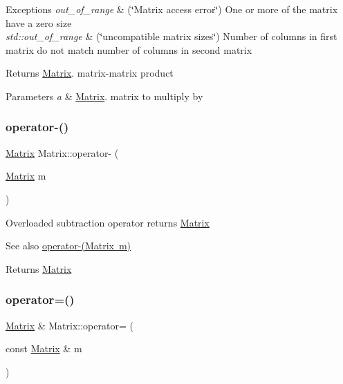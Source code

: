 \begin{DoxyExceptions}{Exceptions}
{\em out\+\_\+of\+\_\+range} & (\char`\"{}\+Matrix access error\char`\"{}) One or more of the matrix have a zero size \\
\hline
{\em std\+::out\+\_\+of\+\_\+range} & (\char`\"{}uncompatible matrix sizes\char`\"{}) Number of columns in first matrix do not match number of columns in second matrix \\
\hline
\end{DoxyExceptions}
\begin{DoxyReturn}{Returns}
\mbox{\hyperlink{class_matrix}{Matrix}}. matrix-\/matrix product 
\end{DoxyReturn}

\begin{DoxyParams}{Parameters}
{\em a} & \mbox{\hyperlink{class_matrix}{Matrix}}. matrix to multiply by \\
\hline
\end{DoxyParams}
\mbox{\label{class_matrix_a2aabf841a4302d528f8b102c0800a263}} 
\subsubsection{\texorpdfstring{operator-\/()}{operator-()}}
{\footnotesize\ttfamily \mbox{\hyperlink{class_matrix}{Matrix}} Matrix\+::operator-\/ (\begin{DoxyParamCaption}\item[{\mbox{\hyperlink{class_matrix}{Matrix}}}]{m }\end{DoxyParamCaption})}

Overloaded subtraction operator returns \mbox{\hyperlink{class_matrix}{Matrix}} \begin{DoxySeeAlso}{See also}
\mbox{\hyperlink{class_matrix_a2aabf841a4302d528f8b102c0800a263}{operator-\/(\+Matrix m)}} 
\end{DoxySeeAlso}
\begin{DoxyReturn}{Returns}
\mbox{\hyperlink{class_matrix}{Matrix}} 
\end{DoxyReturn}
\mbox{\label{class_matrix_aea5a06385f646eb4a63929fae6fa3e14}} 
\subsubsection{\texorpdfstring{operator=()}{operator=()}}
{\footnotesize\ttfamily \mbox{\hyperlink{class_matrix}{Matrix}} \& Matrix\+::operator= (\begin{DoxyParamCaption}\item[{const \mbox{\hyperlink{class_matrix}{Matrix}} \&}]{m }\end{DoxyParamCaption})}


